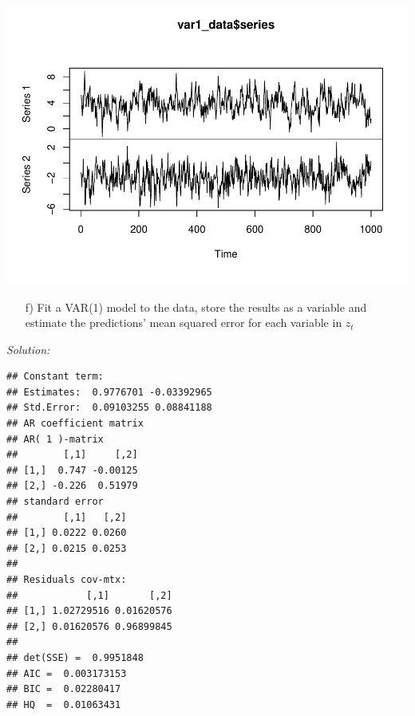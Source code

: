 \documentclass[12pt,a4paper]{article}
\newenvironment{Shaded}{\begin{snugshade}}{\end{snugshade}}
\newcommand{\CommentTok}[1]{\textcolor[rgb]{0.56,0.35,0.01}{\textit{#1}}}
\newcommand{\DataTypeTok}[1]{\textcolor[rgb]{0.13,0.29,0.53}{#1}}
\newcommand{\DecValTok}[1]{\textcolor[rgb]{0.00,0.00,0.81}{#1}}
\newcommand{\KeywordTok}[1]{\textcolor[rgb]{0.13,0.29,0.53}{\textbf{#1}}}
\newcommand{\NormalTok}[1]{#1}
\newcommand{\OperatorTok}[1]{\textcolor[rgb]{0.81,0.36,0.00}{\textbf{#1}}}
\newcommand{\OtherTok}[1]{\textcolor[rgb]{0.56,0.35,0.01}{#1}}
\newcommand{\StringTok}[1]{\textcolor[rgb]{0.31,0.60,0.02}{#1}}
\begin{document}
\includegraphics{solution_exercise_4_files/figure-latex/1_e-1.pdf}

\begin{itemize}
    \item[f)] Fit a VAR(1) model to the data, store the results as a variable and estimate the predictions’ mean squared error for each variable in $z_t$
\end{itemize}

\emph{Solution:}

\begin{Shaded}
\end{Shaded}

\begin{verbatim}
## Constant term: 
## Estimates:  0.9776701 -0.03392965 
## Std.Error:  0.09103255 0.08841188 
## AR coefficient matrix 
## AR( 1 )-matrix 
##        [,1]     [,2]
## [1,]  0.747 -0.00125
## [2,] -0.226  0.51979
## standard error 
##        [,1]   [,2]
## [1,] 0.0222 0.0260
## [2,] 0.0215 0.0253
##   
## Residuals cov-mtx: 
##            [,1]       [,2]
## [1,] 1.02729516 0.01620576
## [2,] 0.01620576 0.96899845
##   
## det(SSE) =  0.9951848 
## AIC =  0.003173153 
## BIC =  0.02280417 
## HQ  =  0.01063431
\end{verbatim}

\begin{Shaded}
\end{Shaded}
\end{document}
